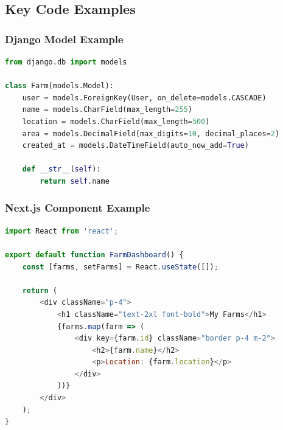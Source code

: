 \subsection{Key Code Examples}
\subsubsection{Django Model Example}
\begin{lstlisting}[language=Python, caption=Farm Model]
from django.db import models

class Farm(models.Model):
	user = models.ForeignKey(User, on_delete=models.CASCADE)
	name = models.CharField(max_length=255)
	location = models.CharField(max_length=500)
	area = models.DecimalField(max_digits=10, decimal_places=2)
	created_at = models.DateTimeField(auto_now_add=True)
    
	def __str__(self):
		return self.name
\end{lstlisting}

\subsubsection{Next.js Component Example}
\begin{lstlisting}[language=JavaScript, caption=Farm Dashboard Component]
import React from 'react';

export default function FarmDashboard() {
	const [farms, setFarms] = React.useState([]);
    
	return (
		<div className="p-4">
			<h1 className="text-2xl font-bold">My Farms</h1>
			{farms.map(farm => (
				<div key={farm.id} className="border p-4 m-2">
					<h2>{farm.name}</h2>
					<p>Location: {farm.location}</p>
				</div>
			))}
		</div>
	);
}
\end{lstlisting}
